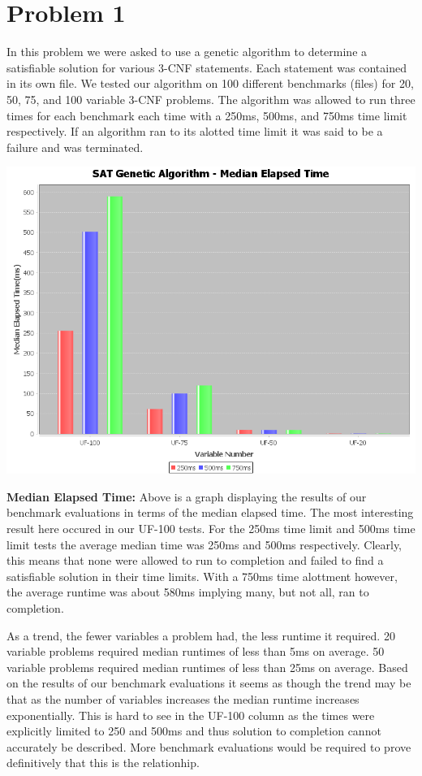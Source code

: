 \documentclass[10pt,a4paper]{article}
\begin{document}
	
	\section*{Problem 1}

	In this problem we were asked to use a genetic algorithm to determine a satisfiable solution for various 3-CNF statements. Each statement was contained in its own file. We tested our algorithm on 100 different benchmarks (files) for 20, 50, 75, and 100 variable 3-CNF problems. The algorithm was allowed to run three times for each benchmark each time with a 250ms, 500ms, and 750ms time limit respectively. If an algorithm ran to its alotted time limit it was said to be a failure and was terminated.

	\begin{center}
		\includegraphics[scale=0.35]{median_time}
	\end{center}
	
	\textbf{Median Elapsed Time:} Above is a graph displaying the results of our benchmark evaluations in terms of the median elapsed time. The most interesting result here occured in our UF-100 tests. For the 250ms time limit and 500ms time limit tests the average median time was 250ms and 500ms respectively. Clearly, this means that none were allowed to run to completion and failed to find a satisfiable solution in their time limits. With a 750ms time alottment however, the average runtime was about 580ms implying many, but not all, ran to completion.
	
	As a trend, the fewer variables a problem had, the less runtime it required. 20 variable problems required median runtimes of less than 5ms on average. 50 variable problems required median runtimes of less than 25ms on average. Based on the results of our benchmark evaluations it seems as though the trend may be that as the number of variables increases the median runtime increases exponentially. This is hard to see in the UF-100 column as the times were explicitly limited to 250 and 500ms and thus solution to completion cannot accurately be described. More benchmark evaluations would be required to prove definitively that this is the relationhip.
	
\end{document}
